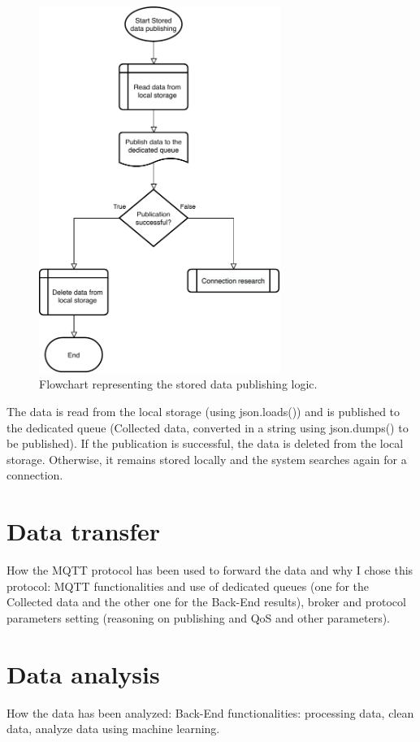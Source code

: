\begin{figure}[h]
\centering 
\includegraphics[width=0.7\textwidth]{images/flowstorage} 
\caption{Flowchart representing the stored data publishing logic.}
\label{fig:flowstorage}
\end{figure}

The data is read from the local storage (using json.loads()) and is published to the dedicated queue (Collected data, converted in a string using json.dumps() to be published). 
If the publication is successful, the data is deleted from the local storage. Otherwise, it remains stored locally and the system searches again for a connection.


\section{Data transfer}
\label{sec:transfer}
\vspace{0.2 cm} 

How the MQTT protocol has been used to forward the data and why I chose this protocol: MQTT functionalities and use of dedicated queues (one for the Collected data and the other one for the Back-End results), broker and protocol parameters setting (reasoning on publishing and QoS and other parameters).


\section{Data analysis}
\label{sec:analysis}
\vspace{0.2 cm} 

How the data has been analyzed: Back-End functionalities: processing data, clean data, analyze data using machine learning.
